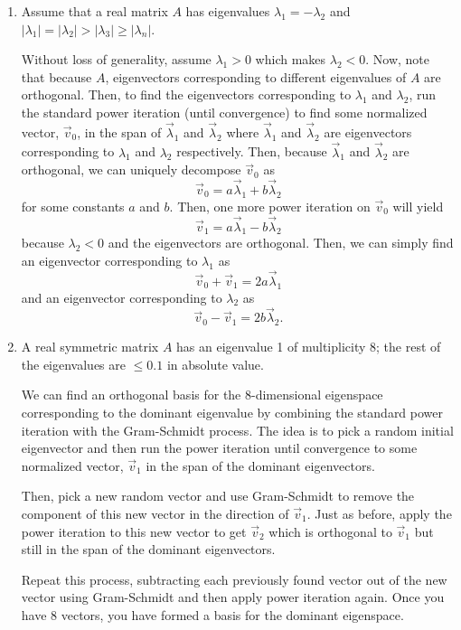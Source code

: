 \documentclass[a4paper,12pt]{article}
\newcommand{\abs}[1]{\left| #1 \right|}
\begin{document}
\begin{enumerate}[label = (\arabic*)]
	\newpage
	\item Assume that a real matrix $ A $ has eigenvalues $ \lambda_1 = -\lambda_2 $ and $ \abs{\lambda_1} = \abs{\lambda_2} > \abs{\lambda_3} \geq \abs{\lambda_n} $. 
	
	Without loss of generality, assume $ \lambda_1 > 0 $ which makes $ \lambda_2 < 0 $. Now, note that because $ A $, eigenvectors corresponding to different eigenvalues of $ A $ are orthogonal. Then, to find the eigenvectors corresponding to $ \lambda_1 $ and $ \lambda_2 $, run the standard power iteration (until convergence) to find some normalized vector, $ \vec{v}_0 $, in the span of $ \vec{\lambda}_1 $ and $ \vec{\lambda}_2 $ where $ \vec{\lambda}_1 $ and $ \vec{\lambda}_2 $ are eigenvectors corresponding to $ \lambda_1 $ and $ \lambda_2 $ respectively. Then, because $ \vec{\lambda}_1 $ and $ \vec{\lambda}_2 $ are orthogonal, we can uniquely decompose $ \vec{v}_0 $ as 
	\[
		\vec{v}_0 = a \vec{\lambda}_1 + b \vec{\lambda}_2
	\]
	for some constants $ a $ and $ b $. Then, one more power iteration on $ \vec{v}_0 $ will yield
	\[
		\vec{v}_1 = a \vec{\lambda}_1 - b \vec{\lambda}_2
	\]
	because $ \lambda_2 < 0 $ and the eigenvectors are orthogonal. Then, we can simply find an eigenvector corresponding to $ \lambda_1 $ as
	\[
		\vec{v}_0 + \vec{v}_1 = 2a \vec{\lambda}_1
	\]
	and an eigenvector corresponding to $ \lambda_2 $ as 
	\[
		\vec{v}_0 - \vec{v}_1 = 2b \vec{\lambda}_2.
 	\]
 	
 	\newpage
 	\item A real symmetric matrix $ A $ has an eigenvalue 1 of multiplicity $ 8 $; the rest of the eigenvalues are $ \leq 0.1 $ in absolute value.
 	
 	We can find an orthogonal basis for the $ 8 $-dimensional eigenspace corresponding to the dominant eigenvalue by combining the standard power iteration with the Gram-Schmidt process. The idea is to pick a random initial eigenvector and then run the power iteration until convergence to some normalized vector, $ \vec{v}_1 $ in the span of the dominant eigenvectors.
 	
 	Then, pick a new random vector and use Gram-Schmidt to remove the component of this new vector in the direction of $ \vec{v}_1 $. Just as before, apply the power iteration to this new vector to get $ \vec{v}_2 $ which is orthogonal to $ \vec{v}_1 $ but still in the span of the dominant eigenvectors.
 	
 	Repeat this process, subtracting each previously found vector out of the new vector using Gram-Schmidt and then apply power iteration again. Once you have 8 vectors, you have formed a basis for the dominant eigenspace.
 	

\end{enumerate}
\end{document}

